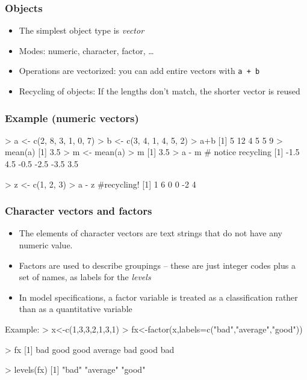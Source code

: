 \documentclass{beamer}
\newcommand{\code}[1]{\texttt{#1}}
\let\overbatim\verbatim
\let\endoverbatim\endverbatim
\newenvironment{vcode}%
{\bgroup\baselineskip=0.8\baselineskip\overbatim}%
{\endoverbatim\egroup}
\begin{document}
\begin{frame}
  \frametitle{Objects}
  \begin{itemize}
  \item The simplest object type is \emph{vector}
  \item Modes: numeric,  character,  factor, \ldots
  \item Operations are vectorized: you can add entire vectors with
    \code{a + b}
  \item Recycling of objects: If the lengths don't match, the shorter
    vector is reused 
  \end{itemize}
\end{frame}


\begin{frame}[fragile]
\frametitle{Example (numeric vectors)}
\begin{vcode}
> a <- c(2, 8, 3, 1, 0, 7)
> b <- c(3, 4, 1, 4, 5, 2)
> a+b
[1]  5 12  4  5  5  9
> mean(a)
[1] 3.5
> m <- mean(a)
> m
[1] 3.5
> a - m # notice recycling
[1] -1.5  4.5 -0.5 -2.5 -3.5  3.5

> z <- c(1, 2, 3)
> a - z   #recycling!
[1]  1  6  0  0 -2  4
\end{vcode}
\end{frame}


\begin{frame}[fragile]
  \frametitle{Character vectors and factors}
  \begin{itemize}
  \item The elements of character vectors are text strings that do not have any numeric value.  
  \item \alert{Factors} are used to describe groupings -- these are just integer codes plus a set of names, as labels for
    the \emph{levels}
  \item In model specifications, a factor variable is treated as a classification
    rather than as a quantitative variable
  \end{itemize}
 Example: 
\begin{vcode}
> x<-c(1,3,3,2,1,3,1)
> fx<-factor(x,labels=c("bad","average","good"))

> fx
[1] bad     good    good    average bad     good    bad    

 > levels(fx)
[1] "bad"     "average" "good"       
 \end{vcode}     
\end{frame}
\end{document}
